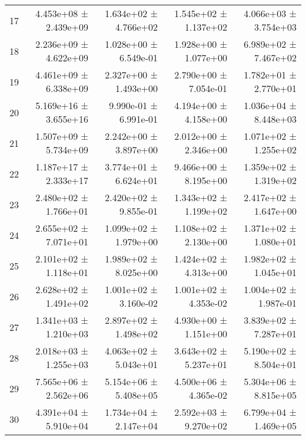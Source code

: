 \begin{table}[htbp]
\begin{tabular}{lrrrr}
17 & 4.453e+08 ± 2.439e+09 & 1.634e+02 ± 4.766e+02 & 1.545e+02 ± 1.137e+02 & 4.066e+03 ± 3.754e+03 \\
18 & 2.236e+09 ± 4.622e+09 & 1.028e+00 ± 6.549e-01 & 1.928e+00 ± 1.077e+00 & 6.989e+02 ± 7.467e+02 \\
19 & 4.461e+09 ± 6.338e+09 & 2.327e+00 ± 1.493e+00 & 2.790e+00 ± 7.054e-01 & 1.782e+01 ± 2.770e+01 \\
20 & 5.169e+16 ± 3.655e+16 & 9.990e-01 ± 6.991e-01 & 4.194e+00 ± 4.158e+00 & 1.036e+04 ± 8.448e+03 \\
21 & 1.507e+09 ± 5.734e+09 & 2.242e+00 ± 3.897e+00 & 2.012e+00 ± 2.346e+00 & 1.071e+02 ± 1.255e+02 \\
22 & 1.187e+17 ± 2.333e+17 & 3.774e+01 ± 6.624e+01 & 9.466e+00 ± 8.195e+00 & 1.359e+02 ± 1.319e+02 \\
23 & 2.480e+02 ± 1.766e+01 & 2.420e+02 ± 9.855e-01 & 1.343e+02 ± 1.199e+02 & 2.417e+02 ± 1.647e+00 \\
24 & 2.655e+02 ± 7.071e+01 & 1.099e+02 ± 1.979e+00 & 1.108e+02 ± 2.130e+00 & 1.371e+02 ± 1.080e+01 \\
25 & 2.101e+02 ± 1.118e+01 & 1.989e+02 ± 8.025e+00 & 1.424e+02 ± 4.313e+00 & 1.982e+02 ± 1.045e+01 \\
26 & 2.628e+02 ± 1.491e+02 & 1.001e+02 ± 3.160e-02 & 1.001e+02 ± 4.353e-02 & 1.004e+02 ± 1.987e-01 \\
27 & 1.341e+03 ± 1.210e+03 & 2.897e+02 ± 1.498e+02 & 4.930e+00 ± 1.151e+00 & 3.839e+02 ± 7.287e+01 \\
28 & 2.018e+03 ± 1.255e+03 & 4.063e+02 ± 5.043e+01 & 3.643e+02 ± 5.237e+01 & 5.190e+02 ± 8.504e+01 \\
29 & 7.565e+06 ± 2.562e+06 & 5.154e+06 ± 5.408e+05 & 4.500e+06 ± 4.365e-02 & 5.304e+06 ± 8.815e+05 \\
30 & 4.391e+04 ± 5.910e+04 & 1.734e+04 ± 2.147e+04 & 2.592e+03 ± 9.270e+02 & 6.799e+04 ± 1.469e+05 \\
    \bottomrule
    \end{tabular}
    \end{table}